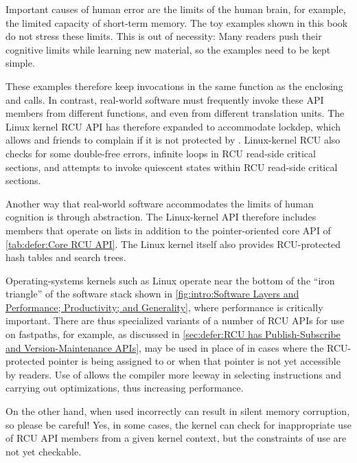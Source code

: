 Important causes of human error are the limits of the human brain,
for example, the limited capacity of short-term memory.
The toy examples shown in this book do not stress these limits.
This is out of necessity:
Many readers push their cognitive limits while learning new material,
so the examples need to be kept simple.

These examples therefore keep  invocations
in the same function as the enclosing  and
 calls.
In contrast, real-world software must frequently invoke these API members
from different functions, and even from different translation units.
The Linux kernel RCU API has therefore expanded to accommodate lockdep,
which allows  and friends to complain if it is
not protected by .
Linux-kernel RCU also checks for some double-free errors, infinite
loops in RCU read-side critical sections, and attempts to invoke
quiescent states within RCU read-side critical sections.

Another way that real-world software accommodates the limits of human
cognition is through abstraction.
The Linux-kernel API therefore includes members that operate on lists
in addition to the pointer-oriented core API of
\cref{tab:defer:Core RCU API}.
The Linux kernel itself also provides RCU-protected hash tables and
search trees.

Operating-systems kernels such as Linux operate near the bottom of the
``iron triangle'' of the software stack shown in
\cref{fig:intro:Software Layers and Performance; Productivity; and Generality},
where performance is critically important.
There are thus specialized variants of a number of RCU APIs for use on
fastpaths, for example, as discussed in
\cref{sec:defer:RCU has Publish-Subscribe and Version-Maintenance APIs},
 may be used in
place of  in cases where the RCU-protected pointer
is being assigned to  or when that pointer is not yet accessible
by readers.
Use of  allows the compiler more leeway in
selecting instructions and carrying out optimizations, thus increasing
performance.

On the other hand, when used incorrectly  can
result in silent memory corruption, so please be careful!
Yes, in some cases, the kernel can check for inappropriate use of
RCU API members from a given kernel context, but the constraints of
 use are not yet checkable.

